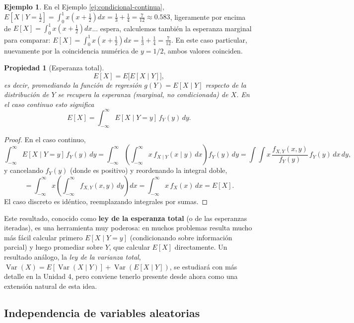 \documentclass[11pt,a4paper]{article}
\theoremstyle{plain}
\newtheorem{propiedad}[teorema]{Propiedad}
\theoremstyle{definition}
\newtheorem{ejemplo}[teorema]{Ejemplo}
\theoremstyle{remark}
\begin{document}
\begin{ejemplo}
En el Ejemplo \ref{ej:condicional-continua}, $E[X\mid Y=\tfrac12] = \int_0^1 x\left(x+\tfrac12\right)dx = \tfrac13+\tfrac14=\tfrac{7}{12}\approx0.583$, ligeramente por encima de $E[X]=\int_0^1 x(x+\tfrac12)dx$... espera, calculemos también la esperanza marginal para comparar: $E[X] = \int_0^1 x\left(x+\tfrac12\right)dx = \tfrac13+\tfrac14=\tfrac{7}{12}$. En este caso particular, nuevamente por la coincidencia numérica de $y=1/2$, ambos valores coinciden.
\end{ejemplo}

\begin{propiedad}[Esperanza total]\label{prop:esperanza-total}
\[
E[X] = E\big[E[X\mid Y]\big],
\]
es decir, promediando la función de regresión $g(Y)=E[X\mid Y]$ respecto de la distribución de $Y$ se recupera la esperanza (marginal, no condicionada) de $X$. En el caso continuo esto significa
\[
E[X] = \int_{-\infty}^\infty E[X\mid Y=y]\, f_Y(y)\, dy.
\]
\end{propiedad}

\begin{proof}
En el caso continuo,
\[
\int_{-\infty}^\infty E[X\mid Y=y]\,f_Y(y)\,dy = \int_{-\infty}^\infty\left(\int_{-\infty}^\infty x\,f_{X\mid Y}(x\mid y)\,dx\right)f_Y(y)\,dy = \int\int x\,\frac{f_{X,Y}(x,y)}{f_Y(y)}\,f_Y(y)\,dx\,dy,
\]
y cancelando $f_Y(y)$ (donde es positivo) y reordenando la integral doble,
\[
= \int_{-\infty}^\infty x\left(\int_{-\infty}^\infty f_{X,Y}(x,y)\,dy\right)dx = \int_{-\infty}^\infty x\, f_X(x)\,dx = E[X].
\]
El caso discreto es idéntico, reemplazando integrales por sumas.
\end{proof}

Este resultado, conocido como \textbf{ley de la esperanza total} (o de las esperanzas iteradas), es una herramienta muy poderosa: en muchos problemas resulta mucho más fácil calcular primero $E[X\mid Y=y]$ (condicionando sobre información parcial) y luego promediar sobre $Y$, que calcular $E[X]$ directamente. Un resultado análogo, la \emph{ley de la varianza total}, $\operatorname{Var}(X) = E[\operatorname{Var}(X\mid Y)] + \operatorname{Var}(E[X\mid Y])$, se estudiará con más detalle en la Unidad 4, pero conviene tenerlo presente desde ahora como una extensión natural de esta idea.

\subsection{Independencia de variables aleatorias}\label{sec:independencia}
\end{document}
